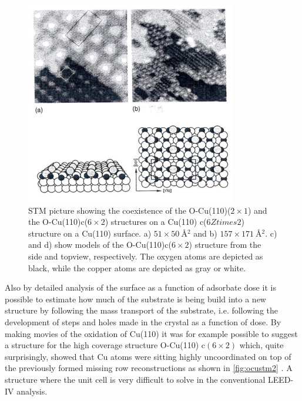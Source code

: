 \begin{figure}[h!]
	\begin{center}
	\includegraphics[scale=4]{figures/10_11.png}
	\caption{STM picture showing the coexistence of the O-Cu(110)($2\times 1$) and the O-Cu(110)c($6\times 2$) structures on a Cu(110) c($6Ztimes 2$) structure on a Cu(110) surface. a) $51\times \SI{50}{\angstrom^2}$ and b) $157\times \SI{171}{\angstrom^2}$. c) and d) show models of the O-Cu(110)c($6\times 2$) structure from the side and topview, respectively. The oxygen atoms are depicted as black, while the copper atoms are depicted as gray or white.}
	\label{fig:ocustm}
	\end{center}
\end{figure}

Also by detailed analysis of the surface as a function of adsorbate dose it is possible to estimate how much of the substrate is being build into a new structure by following the mass transport of the substrate, i.e. following the  development of steps and holes made in the crystal as a function of dose. By making movies of the oxidation of Cu(110) it was for example possible to suggest a structure for the high coverage structure O-Cu(110) c$(6\times 2)$ which, quite surprisingly, showed that Cu atoms were sitting highly uncoordinated on top of the previously formed missing row reconstructions as shown in \autoref{fig:ocustm2} \cite{Besenbacher1}. A structure where the unit cell is very difficult to solve in the conventional LEED-IV analysis.

